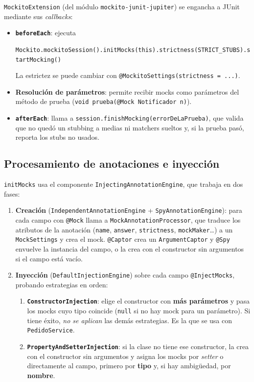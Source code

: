 \documentclass[11pt,a4paper,oneside]{report}
\newcommand{\code}[1]{\texttt{#1}}
\begin{document}
\code{MockitoExtension} (del módulo \code{mockito-junit-jupiter}) se engancha a JUnit mediante sus \emph{callbacks}:
\begin{itemize}
  \item \textbf{\code{beforeEach}}: ejecuta
\begin{center}\code{Mockito.mockitoSession().initMocks(this).strictness(STRICT\_STUBS).startMocking()}\end{center} La estrictez se puede cambiar con \code{@MockitoSettings(strictness = ...)}.
  \item \textbf{Resolución de parámetros}: permite recibir mocks como parámetros del método de prueba (\code{void prueba(@Mock Notificador n)}).
  \item \textbf{\code{afterEach}}: llama a \code{session.finishMocking(errorDeLaPrueba)}, que valida que no quedó un stubbing a medias ni matchers sueltos y, si la prueba pasó, reporta los stubs no usados.
\end{itemize}

\subsection{Procesamiento de anotaciones e inyección}
\code{initMocks} usa el componente \code{InjectingAnnotationEngine}, que trabaja en dos fases:

\begin{enumerate}
  \item \textbf{Creación} (\code{IndependentAnnotationEngine} + \code{SpyAnnotationEngine}): para cada campo con \code{@Mock} llama a \code{MockAnnotationProcessor}, que traduce los atributos de la anotación (\code{name}, \code{answer}, \code{strictness}, \code{mockMaker}\ldots) a un \code{MockSettings} y crea el mock. \code{@Captor} crea un \code{ArgumentCaptor} y \code{@Spy} envuelve la instancia del campo, o la crea con el constructor sin argumentos si el campo está vacío.
  \item \textbf{Inyección} (\code{DefaultInjectionEngine}) sobre cada campo \code{@InjectMocks}, probando estrategias en orden:
  \begin{enumerate}
    \item \textbf{\code{ConstructorInjection}}: elige el constructor con \textbf{más parámetros} y pasa los mocks cuyo tipo coincide (\code{null} si no hay mock para un parámetro). Si tiene éxito, \emph{no se aplican} las demás estrategias. Es la que se usa con \code{PedidoService}.
    \item \textbf{\code{PropertyAndSetterInjection}}: si la clase no tiene ese constructor, la crea con el constructor sin argumentos y asigna los mocks por \emph{setter} o directamente al campo, primero por \textbf{tipo} y, si hay ambigüedad, por \textbf{nombre}.
  \end{enumerate}
\end{enumerate}
\end{document}
